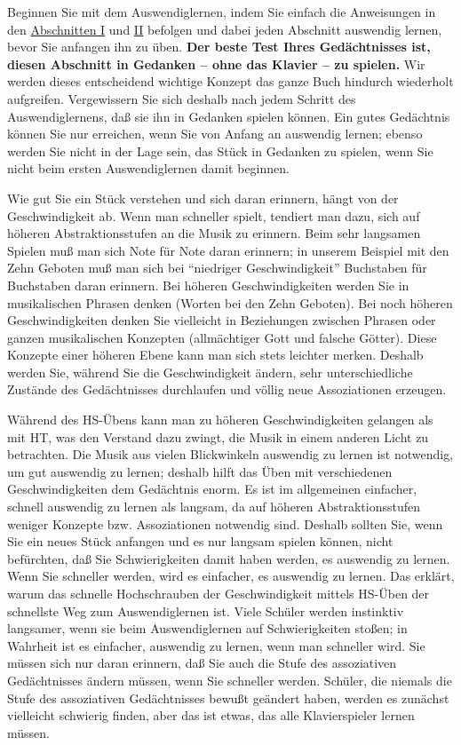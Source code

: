 Beginnen Sie mit dem Auswendiglernen, indem Sie einfach die Anweisungen in den \hyperref[c1i1]{Abschnitten I} und \hyperref[c1ii1]{II} befolgen und dabei jeden Abschnitt auswendig lernen, bevor Sie anfangen ihn zu üben.
\textbf{Der beste Test Ihres Gedächtnisses ist, diesen Abschnitt in Gedanken -- ohne das Klavier -- zu spielen.}
Wir werden dieses entscheidend wichtige Konzept das ganze Buch hindurch wiederholt aufgreifen.
Vergewissern Sie sich deshalb nach jedem Schritt des Auswendiglernens, daß sie ihn in Gedanken spielen können.
Ein gutes Gedächtnis können Sie nur erreichen, wenn Sie von Anfang an auswendig lernen; ebenso werden Sie nicht in der Lage sein, das Stück in Gedanken zu spielen, wenn Sie nicht beim ersten Auswendiglernen damit beginnen.

Wie gut Sie ein Stück verstehen und sich daran erinnern, hängt von der Geschwindigkeit ab.
Wenn man schneller spielt, tendiert man dazu, sich auf höheren Abstraktionsstufen an die Musik zu erinnern.
Beim sehr langsamen Spielen muß man sich Note für Note daran erinnern; in unserem Beispiel mit den Zehn Geboten muß man sich bei \enquote{niedriger Geschwindigkeit} Buchstaben für Buchstaben daran erinnern.
Bei höheren Geschwindigkeiten werden Sie in musikalischen Phrasen denken (Worten bei den Zehn Geboten).
Bei noch höheren Geschwindigkeiten denken Sie vielleicht in Beziehungen zwischen Phrasen oder ganzen musikalischen Konzepten (allmächtiger Gott und falsche Götter).
Diese Konzepte einer höheren Ebene kann man sich stets leichter merken.
Deshalb werden Sie, während Sie die Geschwindigkeit ändern, sehr unterschiedliche Zustände des Gedächtnisses durchlaufen und völlig neue Assoziationen erzeugen.

Während des HS-Übens kann man zu höheren Geschwindigkeiten gelangen als mit HT, was den Verstand dazu zwingt, die Musik in einem anderen Licht zu betrachten.
Die Musik aus vielen Blickwinkeln auswendig zu lernen ist notwendig, um gut auswendig zu lernen; deshalb hilft das Üben mit verschiedenen Geschwindigkeiten dem Gedächtnis enorm.
Es ist im allgemeinen einfacher, schnell auswendig zu lernen als langsam, da auf höheren Abstraktionsstufen weniger Konzepte bzw. Assoziationen notwendig sind.
Deshalb sollten Sie, wenn Sie ein neues Stück anfangen und es nur langsam spielen können, nicht befürchten, daß Sie Schwierigkeiten damit haben werden, es auswendig zu lernen.
Wenn Sie schneller werden, wird es einfacher, es auswendig zu lernen.
Das erklärt, warum das schnelle Hochschrauben der Geschwindigkeit mittels HS-Üben der schnellste Weg zum Auswendiglernen ist.
Viele Schüler werden instinktiv langsamer, wenn sie beim Auswendiglernen auf Schwierigkeiten stoßen; in Wahrheit ist es einfacher, auswendig zu lernen, wenn man schneller wird.
Sie müssen sich nur daran erinnern, daß Sie auch die Stufe des assoziativen Gedächtnisses ändern müssen, wenn Sie schneller werden.
Schüler, die niemals die Stufe des assoziativen Gedächtnisses bewußt geändert haben, werden es zunächst vielleicht schwierig finden, aber das ist etwas, das alle Klavierspieler lernen müssen.

